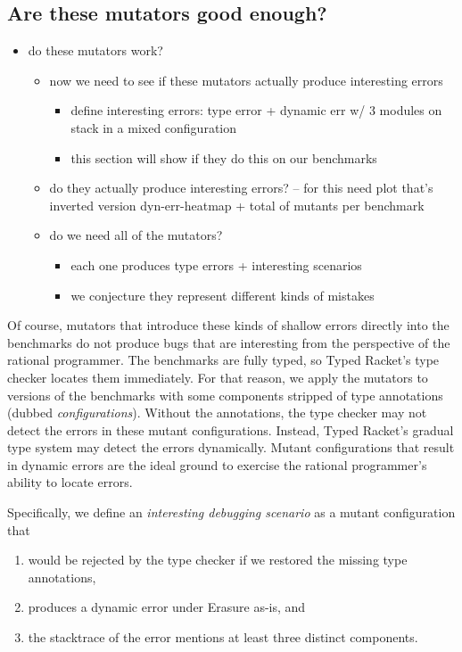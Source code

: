 \subsection{Are these mutators good enough?}
\begin{itemize}
\item do these mutators work?
\begin{itemize}
\item now we need to see if these mutators actually produce interesting errors
\begin{itemize}
\item define interesting errors: type error + dynamic err w/ 3 modules on stack in a mixed configuration
\item this section will show if they do this on our benchmarks
\end{itemize}
\item do they actually produce interesting errors? -- for this need plot that's inverted version dyn-err-heatmap + total of mutants per benchmark
\item do we need all of the mutators?
\begin{itemize}
\item each one produces type errors + interesting scenarios
\item we conjecture they represent different kinds of mistakes
\end{itemize}
\end{itemize}
\end{itemize}

Of course, mutators that introduce these kinds of shallow errors directly into the benchmarks do not produce bugs that are interesting from the perspective of the rational programmer.
The benchmarks are fully typed, so Typed Racket's type checker locates them immediately.
For that reason, we apply the mutators to versions of the benchmarks with some components stripped of type annotations (dubbed \emph{configurations}).
Without the annotations, the type checker may not detect the errors in these mutant configurations.
Instead, Typed Racket's gradual type system may detect the errors dynamically.
Mutant configurations that result in dynamic errors are the ideal ground to exercise the rational programmer's ability to locate errors.

Specifically, we define an \emph{interesting debugging scenario} as a mutant configuration that
\begin{enumerate}
\item would be rejected by the type checker if we restored the missing type annotations,
\item produces a dynamic error under Erasure as-is, and
\item the stacktrace of the error mentions at least three distinct components.
\end{enumerate}

